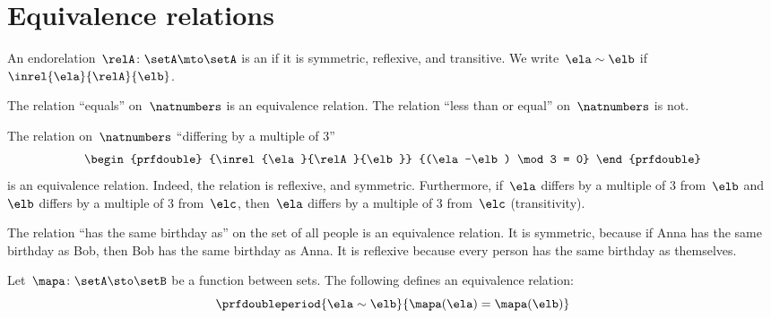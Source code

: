 
\section{Equivalence relations}

\begin{ctdefinition}
    \label{def:equivalence-relation}
    An endorelation~$\relA\colon \setA\mto \setA$ is an \emph{} if it is symmetric, reflexive, and transitive.
    We write~$\ela\sim \elb$ if~$\inrel{\ela}{\relA}{\elb}$.
\end{ctdefinition}

\begin{example}
    The relation ``equals'' on~$\natnumbers$ is an equivalence relation.
    The relation ``less than or equal'' on~$\natnumbers$ is not.
\end{example}

\begin{example}
    The relation on~$\natnumbers$ ``differing by a multiple of 3''
    \begin{equation}
        \begin{prfdouble}
            {\inrel{\ela}{\relA}{\elb}}
            {(\ela-\elb) \mod 3 = 0}
        \end{prfdouble}
    \end{equation}
    is an equivalence relation.
    Indeed, the relation is reflexive, and symmetric.
    Furthermore, if~$\ela$ differs by a multiple of 3 from~$\elb$ and~$\elb$ differs by a multiple of 3 from~$\elc$, then~$\ela$ differs by a multiple of 3 from~$\elc$ (transitivity).
\end{example}

\begin{example}
    The relation ``has the same birthday as'' on the set of all people is an equivalence relation.
    It is symmetric, because if Anna has the same birthday as Bob, then Bob has the same birthday as Anna.
    It is reflexive because every person has the same birthday as themselves.
\end{example}

\begin{example}
    Let~$\mapa\colon \setA \sto \setB$ be a function between sets.
    The following defines an equivalence relation:
    \begin{equation}
        \prfdoubleperiod{
            \ela\sim \elb
        }{
            \mapa(\ela)=\mapa(\elb)
        }
    \end{equation}
\end{example}

